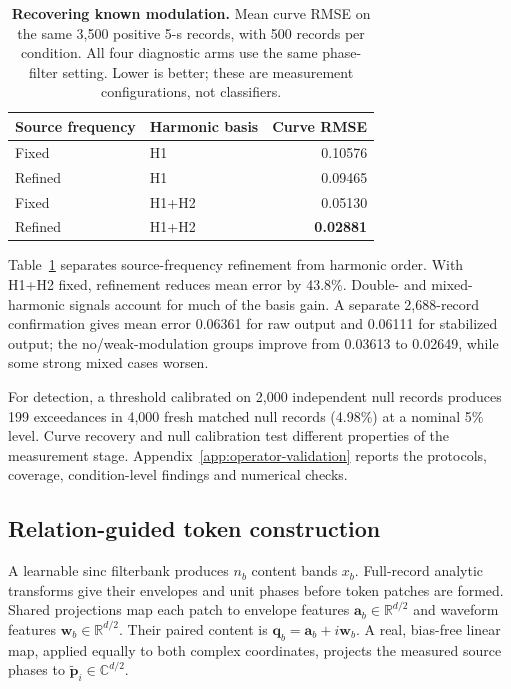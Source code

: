\documentclass[10pt,twocolumn,letterpaper]{article}
\newcommand{\TableStyle}{\fontsize{8}{9.5}\selectfont\setlength{\tabcolsep}{3pt}\renewcommand{\arraystretch}{1.10}}
\begin{document}
\begin{table}[t]
\centering\TableStyle
\caption{\textbf{Recovering known modulation.} Mean curve RMSE on the
same 3,500 positive 5-s records, with 500 records per condition.
All four diagnostic arms use the same phase-filter setting.
Lower is better; these are measurement configurations, not classifiers.}
\label{tab:operator-factorial}
\begin{tabular*}{\linewidth}{@{\extracolsep{\fill}}llr@{}}
\toprule
Source frequency & Harmonic basis & Curve RMSE\\
\midrule
Fixed & H1 & 0.10576\\
Refined & H1 & 0.09465\\
Fixed & H1+H2 & 0.05130\\
Refined & H1+H2 & \textbf{0.02881}\\
\bottomrule
\end{tabular*}
\end{table}

Table~\ref{tab:operator-factorial} separates source-frequency refinement
from harmonic order. With H1+H2 fixed, refinement reduces mean error by
43.8\%. Double- and mixed-harmonic signals account for much of the basis
gain. A separate 2,688-record confirmation gives mean error 0.06361 for
raw output and 0.06111 for stabilized output; the no/weak-modulation
groups improve from 0.03613 to 0.02649, while some strong mixed cases
worsen.

For detection, a threshold calibrated on 2,000 independent null records
produces 199 exceedances in 4,000 fresh matched null records (4.98\%) at
a nominal 5\% level. Curve recovery and null calibration test different
properties of the measurement stage. Appendix~\ref{app:operator-validation}
reports the protocols, coverage, condition-level findings and numerical
checks.

\subsection{Relation-guided token construction}
\label{sec:tokenizer}
A learnable sinc filterbank \citep{ravanelli2018sincnet} produces $n_b$
content bands $x_b$. Full-record analytic transforms give their
envelopes and unit phases before token patches are formed. Shared
projections map each patch to envelope features
$\mathbf a_b\in\mathbb R^{d/2}$ and waveform features
$\mathbf w_b\in\mathbb R^{d/2}$. Their paired content is
$\mathbf q_b=\mathbf a_b+i\mathbf w_b$. A real, bias-free linear map,
applied equally to both complex coordinates, projects the measured
source phases to $\tilde{\mathbf p}_i\in\mathbb C^{d/2}$.
\end{document}
